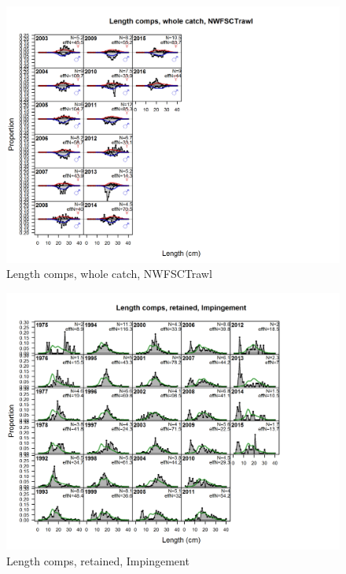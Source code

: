 \documentclass[12pt,]{article}
\begin{document}
\begin{figure}[htbp]
\centering
\includegraphics{./r4ss/plots_mod1/comp_lenfit_flt8mkt0.png}
\caption{Length comps, whole catch, NWFSCTrawl
\label{fig:mod1_10_comp_lenfit_flt8mkt0}}
\end{figure}

\begin{figure}[htbp]
\centering
\includegraphics{./r4ss/plots_mod1/comp_lenfit_flt10mkt2.png}
\caption{Length comps, retained, Impingement
\label{fig:mod1_11_comp_lenfit_flt10mkt2}}
\end{figure}
\end{document}
